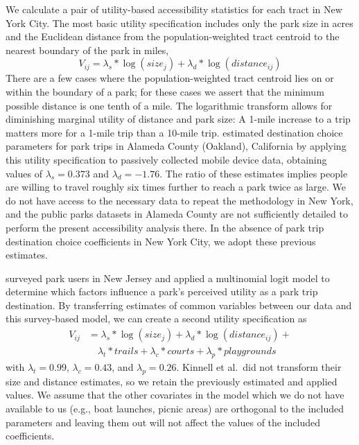 \documentclass[shortAfour,sageh.bst]{sagej}
\begin{document}
\label{subsec:accessibility}

We calculate a pair of utility-based accessibility statistics for each
tract in New York City. The most basic utility specification includes
only the park size in acres and the Euclidean distance from the
population-weighted tract centroid to the nearest boundary of the park
in miles, \begin{equation}\label{eq:u_access}
V_{ij} = \lambda_s * \log(size_j) + \lambda_d * \log(distance_{ij})
\end{equation} There are a few cases where the population-weighted tract
centroid lies on or within the boundary of a park; for these cases we
assert that the minimum possible distance is one tenth of a mile. The
logarithmic transform allows for diminishing marginal utility of
distance and park size: A 1-mile increase to a trip matters more for a
1-mile trip than a 10-mile trip. \citet{Macfarlane2019} estimated
destination choice parameters for park trips in Alameda County
(Oakland), California by applying this utility specification to
passively collected mobile device data, obtaining values of
\(\lambda_s = 0.373\) and \(\lambda_d = -1.76\). The ratio of these
estimates implies people are willing to travel roughly six times further
to reach a park twice as large. We do not have access to the necessary
data to repeat the \citet{Macfarlane2019} methodology in New York, and
the public parks datasets in Alameda County are not sufficiently
detailed to perform the present accessibility analysis there. In the
absence of park trip destination choice coefficients in New York City,
we adopt these previous estimates.

\citet{Kinnell2006} surveyed park users in New Jersey and applied a
multinomial logit model to determine which factors influence a park's
perceived utility as a park trip destination. By transferring estimates
of common variables between our data and this survey-based model, we can
create a second utility specification as
\begin{equation}\label{eq:u_multi}
\begin{split}
V_{ij} & = \lambda_s * \log(size_j) + \lambda_d * \log(distance_{ij}) + \\
  & \quad \lambda_t * trails + \lambda_{c} * courts + \lambda_p * playgrounds
\end{split}
\end{equation} with \(\lambda_t = 0.99\), \(\lambda_c = 0.43\), and
\(\lambda_p = 0.26\). Kinnell et al.~did not transform their size and
distance estimates, so we retain the previously estimated and applied
values. We assume that the other covariates in the model which we do not
have available to us (e.g., boat launches, picnic areas) are orthogonal
to the included parameters and leaving them out will not affect the
values of the included coefficients.
\end{document}
